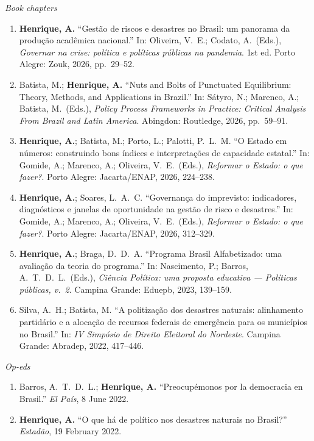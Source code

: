 \documentclass[11pt]{article}
\newcommand{\cvsubsection}[1]{\vspace{0.9em}\textit{#1}\par\vspace{0.35em}}
\begin{document}
\cvsubsection{Book chapters}
\begin{enumerate}[leftmargin=0.3in,itemsep=0.4em,parsep=0pt]
\item \textbf{Henrique, A.} ``Gestão de riscos e desastres no Brasil: um panorama da produção acadêmica nacional.'' In: Oliveira, V.\ E.; Codato, A.\ (Eds.), \textit{Governar na crise: política e políticas públicas na pandemia}. 1st ed. Porto Alegre: Zouk, 2026, pp.\ 29--52.
\item Batista, M.; \textbf{Henrique, A.} ``Nuts and Bolts of Punctuated Equilibrium: Theory, Methods, and Applications in Brazil.'' In: Sátyro, N.; Marenco, A.; Batista, M.\ (Eds.), \textit{Policy Process Frameworks in Practice: Critical Analysis From Brazil and Latin America}. Abingdon: Routledge, 2026, pp.\ 59--91.
\item \textbf{Henrique, A.}; Batista, M.; Porto, L.; Palotti, P.\ L.\ M. ``O Estado em números: construindo bons índices e interpretações de capacidade estatal.'' In: Gomide, A.; Marenco, A.; Oliveira, V.\ E.\ (Eds.), \textit{Reformar o Estado: o que fazer?}. Porto Alegre: Jacarta/ENAP, 2026, 224--238.
\item \textbf{Henrique, A.}; Soares, L.\ A.\ C. ``Governança do imprevisto: indicadores, diagnósticos e janelas de oportunidade na gestão de risco e desastres.'' In: Gomide, A.; Marenco, A.; Oliveira, V.\ E.\ (Eds.), \textit{Reformar o Estado: o que fazer?}. Porto Alegre: Jacarta/ENAP, 2026, 312--329.
\item \textbf{Henrique, A.}; Braga, D.\ D.\ A. ``Programa Brasil Alfabetizado: uma avaliação da teoria do programa.'' In: Nascimento, P.; Barros, A.\ T.\ D.\ L.\ (Eds.), \textit{Ciência Política: uma proposta educativa --- Políticas públicas, v.\ 2}. Campina Grande: Eduepb, 2023, 139--159.
\item Silva, A.\ H.; Batista, M. ``A politização dos desastres naturais: alinhamento partidário e a alocação de recursos federais de emergência para os municípios no Brasil.'' In: \textit{IV Simpósio de Direito Eleitoral do Nordeste}. Campina Grande: Abradep, 2022, 417--446.
\end{enumerate}

\cvsubsection{Op-eds}
\begin{enumerate}[leftmargin=0.3in,itemsep=0.4em,parsep=0pt]
\item Barros, A.\ T.\ D.\ L.; \textbf{Henrique, A.} ``Preocupémonos por la democracia en Brasil.'' \textit{El País}, 8 June 2022.
\item \textbf{Henrique, A.} ``O que há de político nos desastres naturais no Brasil?'' \textit{Estadão}, 19 February 2022.
\end{enumerate}
\end{document}
